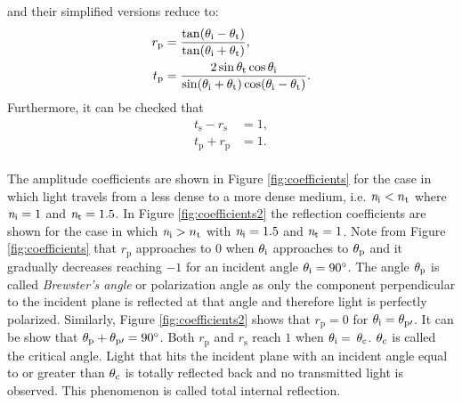 and their simplified versions reduce to:
\begin{equation} \label{simple_Fresnel}
\begin{split}
r_{\textrm{p}} & =  \frac{\tan(\theta_\textrm{i}-\theta_\textrm{t})}{\tan(\theta_\textrm{i}+\theta_\textrm{t})},\\
t_{\textrm{p}} & = \frac{2\sin \theta_\textrm{t} \cos \theta_\textrm{i}}{\sin(\theta_\textrm{i}+\theta_\textrm{t})\cos(\theta_\textrm{i}- \theta_\textrm{t})}.
\end{split}
\end{equation}
Furthermore, it can be checked that
 \begin{equation}
\begin{split}
t_\textrm{s}-r_\textrm{s} &= 1, \\
t_\textrm{p}+r_\textrm{p} &=  1.
\end{split}
\end{equation}
\\ \indent The amplitude coefficients are shown in Figure \ref{fig:coefficients} for the case in which light travels from a less dense to a more dense medium, i.e. $\textit{n}_\textrm{i}<n_\textrm{t}$ where $\textit{n}_{\textrm{i}}= 1$ and $\textit{n}_{\textrm{t}}=1.5$. 
In Figure \ref{fig:coefficients2} the reflection coefficients are shown for the case in which $\textit{n}_\textrm{i}>n_\textrm{t}$ with $\textit{n}_{\textrm{i}}= 1.5$ and $\textit{n}_{\textrm{t}}=1$. Note from Figure \ref{fig:coefficients} that $r_\textrm{p}$ approaches to $0$ when $\theta_\textrm{i}$ approaches to $\theta_\textrm{p}$ and it gradually decreases reaching $-1$ for an incident angle $\theta_\textrm{i}=90^\circ$. The angle $\theta_\textrm{p}$ is called \textit{Brewster's angle} or polarization angle as only the component perpendicular to the incident plane is reflected at that angle and therefore light is perfectly polarized. Similarly, Figure \ref{fig:coefficients2} shows that $r_\textrm{p}=0$ for $\theta_\textrm{i}= \theta_{\textrm{p}\prime}$. It can be show that $\theta_\textrm{p}+ \theta_{\textrm{p}\prime}= 90^\circ$. Both $r_\textrm{p}$ and $r_\textrm{s}$ reach $1$ when $\theta_\textrm{i}= $ $\theta_\textrm{c}$. $\theta_\textrm{c}$ is called the critical angle. Light that hits the incident plane with an incident angle equal to or greater than $\theta_{\textrm{c}}$ is totally reflected back and no transmitted light is observed. This phenomenon is called total internal reflection. 

